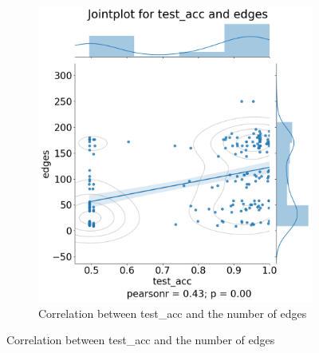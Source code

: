 \begin{figure}[H]
\begin{subfigure}{0.45\textwidth}
        \includegraphics[width=\linewidth]{images/results/random/relu/jointplot_test_acc_edges.png}
        \caption{Correlation between test\_acc and the number of edges} \label{fig:jp_relu_edge}
    \end{subfigure}%
  

\end{figure}
